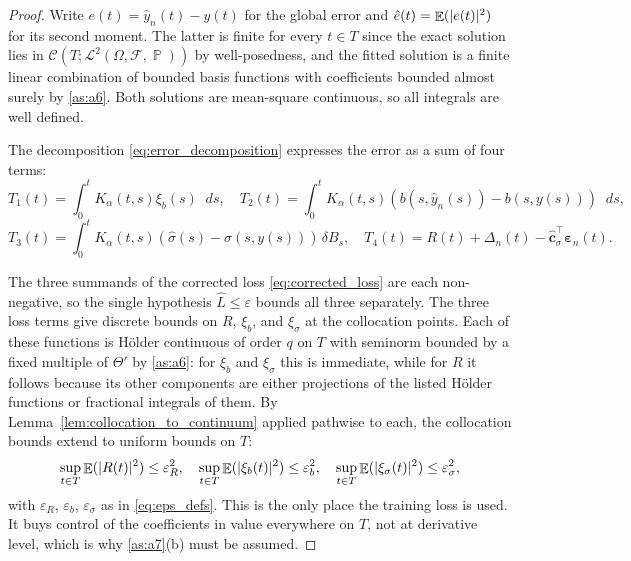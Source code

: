 \documentclass[11pt, a4paper]{article}
\theoremstyle{theoremstyle}
\theoremstyle{definitionstyle}
\newcommand{\dd}{\mathop{}\!d}
\DeclareMathOperator{\PP}{\mathbb P}
\DeclareMathOperator{\EE}{\mathbb E}
\DeclarePairedDelimiter{\abs}{\lvert}{\rvert}
\begin{document}
\begin{proof}
    Write $e(t) = \hat y_n(t) - y(t)$ for the global error and $\hat e(t) = \EE(\abs{e(t)}^2)$ for its second moment. The latter is finite for every $t \in T$ since the exact solution lies in $\mathcal C(T; \mathcal L^2(\Omega, \mathcal F, \PP))$ by well-posedness, and the fitted solution is a finite linear combination of bounded basis functions with coefficients bounded almost surely by \ref{as:a6}. Both solutions are mean-square continuous, so all integrals are well defined.

    The decomposition \eqref{eq:error_decomposition} expresses the error as a sum of four terms:
    \begin{equation}
        T_1(t) = \int_0^t K_\alpha(t, s)\xi_b(s)\dd{s}, \quad T_2(t) = \int_0^t K_\alpha(t, s)(b(s, \hat y_n(s)) - b(s, y(s)))\dd{s},
    \end{equation}
    \begin{equation}
        T_3(t) = \int_0^t K_\alpha(t, s)(\hat \sigma(s) - \sigma(s, y(s)))\, \delta B_s, \quad T_4(t) = R(t) + \Delta_n(t) - \hat{\mathbf c}_\sigma^\top \boldsymbol\varepsilon_n(t).
    \end{equation}
    
    The three summands of the corrected loss \eqref{eq:corrected_loss} are each non-negative, so the single hypothesis $\hat L \leq \varepsilon$ bounds all three separately. The three loss terms give discrete bounds on $R$, $\xi_b$, and $\xi_\sigma$ at the collocation points. Each of these functions is Hölder continuous of order $q$ on $T$ with seminorm bounded by a fixed multiple of $\Theta'$ by \ref{as:a6}: for $\xi_b$ and $\xi_\sigma$ this is immediate, while for $R$ it follows because its other components are either projections of the listed H\"older functions or fractional integrals of them. By Lemma~\ref{lem:collocation_to_continuum} applied pathwise to each, the collocation bounds extend to uniform bounds on $T$:
    \begin{equation}\label{eq:step1_bounds}
        \sup_{t \in T}\EE (\abs{R(t)}^2) \leq \varepsilon_R^2, \quad \sup_{t \in T}\EE (\abs{\xi_b(t)}^2) \leq \varepsilon_b^2, \quad \sup_{t \in T}\EE (\abs{\xi_\sigma(t)}^2) \leq \varepsilon_\sigma^2,
    \end{equation}
    with $\varepsilon_R$, $\varepsilon_b$, $\varepsilon_\sigma$ as in \eqref{eq:eps_defs}. This is the only place the training loss is used. It buys control of the coefficients in value everywhere on $T$, not at derivative level, which is why \ref{as:a7}(b) must be assumed.


\end{proof}
\end{document}
